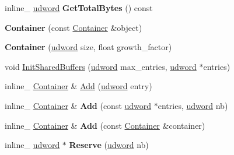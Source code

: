 \begin{DoxyCompactItemize}
\item 
\hypertarget{class_container_a225b40ce711aebc7063a93b295475d91}{inline\+\_\+ \hyperlink{_ice_types_8h_a44c6f1920ba5551225fb534f9d1a1733}{udword} {\bfseries Get\+Total\+Bytes} () const }\label{class_container_a225b40ce711aebc7063a93b295475d91}

\item 
\hypertarget{class_container_a38b2b6815b1dbcb61c255aa4b0c6549d}{{\bfseries Container} (const \hyperlink{class_container}{Container} \&object)}\label{class_container_a38b2b6815b1dbcb61c255aa4b0c6549d}

\item 
\hypertarget{class_container_a357a6c570a212995f29e0c161d0bdedd}{{\bfseries Container} (\hyperlink{_ice_types_8h_a44c6f1920ba5551225fb534f9d1a1733}{udword} size, float growth\+\_\+factor)}\label{class_container_a357a6c570a212995f29e0c161d0bdedd}

\item 
void \hyperlink{class_container_ac629b4dec41669f6a592f2388b7120e8}{Init\+Shared\+Buffers} (\hyperlink{_ice_types_8h_a44c6f1920ba5551225fb534f9d1a1733}{udword} max\+\_\+entries, \hyperlink{_ice_types_8h_a44c6f1920ba5551225fb534f9d1a1733}{udword} $\ast$entries)
\item 
inline\+\_\+ \hyperlink{class_container}{Container} \& \hyperlink{class_container_ab02175b19abdd65e70e2ac36c4d098ab}{Add} (\hyperlink{_ice_types_8h_a44c6f1920ba5551225fb534f9d1a1733}{udword} entry)
\item 
\hypertarget{class_container_a8efe7e32963cd5708b2ff5ec44218b09}{inline\+\_\+ \hyperlink{class_container}{Container} \& {\bfseries Add} (const \hyperlink{_ice_types_8h_a44c6f1920ba5551225fb534f9d1a1733}{udword} $\ast$entries, \hyperlink{_ice_types_8h_a44c6f1920ba5551225fb534f9d1a1733}{udword} nb)}\label{class_container_a8efe7e32963cd5708b2ff5ec44218b09}

\item 
\hypertarget{class_container_aa2a059f89e9cf6cbb2eb40ac9520e61c}{inline\+\_\+ \hyperlink{class_container}{Container} \& {\bfseries Add} (const \hyperlink{class_container}{Container} \&container)}\label{class_container_aa2a059f89e9cf6cbb2eb40ac9520e61c}

\item 
\hypertarget{class_container_af1ee6869e4a834a7100832e50fac3813}{inline\+\_\+ \hyperlink{_ice_types_8h_a44c6f1920ba5551225fb534f9d1a1733}{udword} $\ast$ {\bfseries Reserve} (\hyperlink{_ice_types_8h_a44c6f1920ba5551225fb534f9d1a1733}{udword} nb)}\label{class_container_af1ee6869e4a834a7100832e50fac3813}


\end{DoxyCompactItemize}
